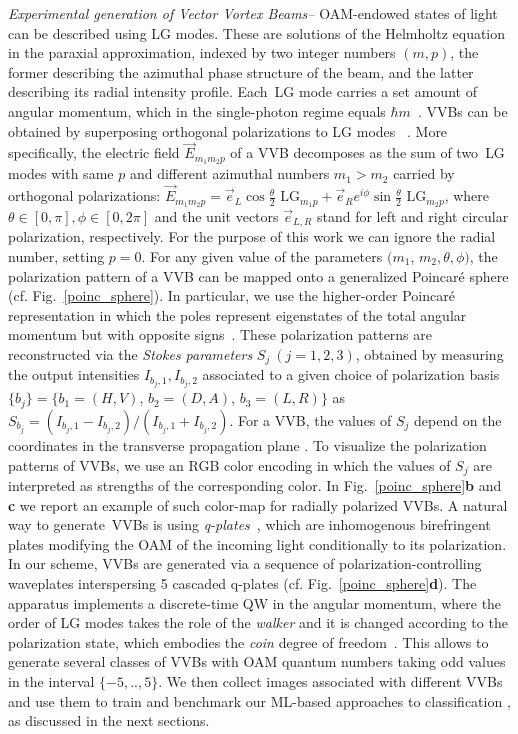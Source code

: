 \documentclass[
	aps, prl, superscriptaddress, twocolumn,
	10pt
	floatfix, 
    nofootinbib,
	tightenlines
]{revtex4-1}
\begin{document}
\textit{Experimental generation of Vector Vortex Beams--} 
OAM-endowed states of light 
can be described using {\ac{LG}} modes.
These are solutions of the Helmholtz equation in the paraxial approximation, indexed by two integer numbers $(m, p)$, the former describing the azimuthal phase structure of the beam, and the latter describing its radial intensity profile.
Each~\ac{LG} mode carries a set amount of angular momentum, which in the single-photon regime equals $\hbar m$~\cite{allen_0AM_1992}.
\acp{VVB} can be obtained by superposing orthogonal polarizations to  LG modes ~\cite{padgett2004light}.
More specifically, the electric field $\Vec{E}_{m_1m_2p}$ of a \ac{VVB}  decomposes as the sum of two~\ac{LG} modes with same $p$ and different azimuthal numbers $m_1>m_2$ carried by orthogonal polarizations:
$\Vec{E}_{m_1m_2p}=\Vec{e}_L \cos{ \frac{\theta}{2}}\text{ LG$_{m_1p}$} +\Vec{e}_R e^{i \phi} \sin{ \frac{\theta}{2}}\text{ LG$_{m_2p}$}$,
where $\theta\in[0,\pi], \phi\in[0,2\pi]$ and the unit vectors $\Vec{e}_{L,R}$ stand for left and right circular polarization, respectively.
For the purpose of this work we can ignore the radial number, setting $p=0$.
For any given value of the parameters $(m_1$, $m_2, \theta, \phi)$,  the polarization pattern of a \ac{VVB} can be mapped onto a generalized Poincar\'e sphere (cf. Fig.~\ref{poinc_sphere}). In particular, we use the higher-order Poincar\'e representation in which the poles represent eigenstates of the total angular momentum but with opposite signs~\cite{milione_poinc_sphere_2011}.
These polarization patterns are reconstructed via the \emph{Stokes parameters} $S_{j}~(j=1,2,3)$, obtained by
measuring the output intensities $I_{b_j,1},I_{b_j,2}$ associated to a given choice of polarization basis $\{b_j \}=\{b_1=( H,V )$, $b_2=( D,A )$, $b_3=( L,R )\}$ as $S_{b_j}=(I_{b_j,1}-I_{b_j,2})/(I_{b_j,1}+I_{b_j,2})$. 
For a VVB, the values of $S_j$ depend on the coordinates in the transverse propagation plane {\cite{Cardano:12}}.
To visualize the polarization patterns of \acp{VVB}, we use an RGB color encoding in which the values of $S_j$ are interpreted as strengths of the corresponding color. In Fig.~\ref{poinc_sphere}{\bf b} and {\bf c} we report an example of such color-map for radially polarized \acp{VVB}.
A natural way to generate~\acp{VVB} is using \emph{q-plates}~\cite{marrucci2006optical,Cardano:12}, which are inhomogenous birefringent plates modifying the OAM of the incoming light conditionally to its polarization. 
In our scheme,
\acp{VVB} are generated via a sequence of polarization-controlling waveplates interspersing 5 cascaded q-plates (cf. Fig.~\ref{poinc_sphere}{\bf d}).
The apparatus implements a discrete-time QW in the angular momentum, where the order of LG modes takes the role of the \emph{walker} and it is changed according to the polarization state, which embodies the \emph{coin} degree of freedom~\cite{zhang-oam-qw-2010,goyal2013implementing,cardano2015quantum,Innocenti2017,giordani_2018}.
This allows to generate several classes of VVBs with OAM quantum numbers taking odd values in the interval $\{-5,..,5\}$.
We then collect images associated with different \acp{VVB} and use them to train and benchmark our ML-based approaches to classification , as discussed in the next sections.
\end{document}
